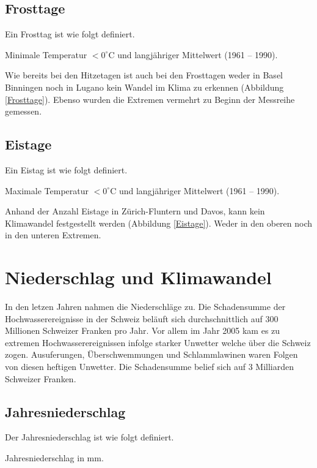\begin{refsection}
\subsection{Frosttage}
Ein Frosttag ist wie folgt definiert.

\begin{definition}
Minimale Temperatur $< 0^{\circ}$C und langjähriger Mittelwert (1961 -- 1990).
\end{definition}

Wie bereits bei den Hitzetagen ist auch bei den Frosttagen weder in Basel Binningen noch in Lugano kein Wandel im Klima zu erkennen (Abbildung \ref{Frosttage}). Ebenso wurden die Extremen vermehrt zu Beginn der Messreihe gemessen.


\subsection{Eistage}
Ein Eistag ist wie folgt definiert.

\begin{definition}
Maximale Temperatur $< 0^{\circ}$C und langjähriger Mittelwert (1961 -- 1990).
\end{definition}

Anhand der Anzahl Eistage in Zürich-Fluntern und Davos, kann kein Klimawandel festgestellt werden (Abbildung \ref{Eistage}). Weder in den oberen noch in den unteren Extremen. 


\section{Niederschlag und Klimawandel}
In den letzen Jahren nahmen die Niederschläge zu. Die Schadensumme der Hochwasserereignisse in der Schweiz beläuft sich durchschnittlich auf 300 Millionen Schweizer Franken pro Jahr. Vor allem im Jahr 2005 kam es zu extremen Hochwasserereignissen infolge starker Unwetter welche über die Schweiz zogen. Ausuferungen, Überschwemmungen und Schlammlawinen waren Folgen von diesen heftigen Unwetter. Die Schadensumme belief sich auf 3 Milliarden Schweizer Franken. 


\subsection{Jahresniederschlag}
Der Jahresniederschlag ist wie folgt definiert.

\begin{definition}
Jahresniederschlag in mm.
\end{definition}


\end{refsection}
